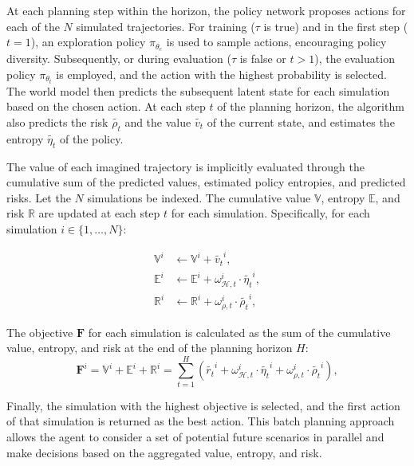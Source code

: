 At each planning step within the horizon, the policy network proposes actions for each of the $N$ simulated trajectories. For training ($\tau$ is true) and in the first step ($t=1$), an exploration policy $\pi_{\theta_e}$ is used to sample actions, encouraging policy diversity. Subsequently, or during evaluation ($\tau$ is false or $t>1$), the evaluation policy $\pi_{\theta_t}$ is employed, and the action with the highest probability is selected. The world model then predicts the subsequent latent state for each simulation based on the chosen action. At each step $t$ of the planning horizon, the algorithm also predicts the risk $\widetilde{\rho_t}$ and the value $\widetilde{v_t}$ of the current state, and estimates the entropy $\widetilde{\eta_t}$ of the policy.

The value of each imagined trajectory is implicitly evaluated through the cumulative sum of the predicted values, estimated policy entropies, and predicted risks. Let the $N$ simulations be indexed. The cumulative value $\mathbb{V}$, entropy $\mathbb{E}$, and risk $\mathbb{R}$ are updated at each step $t$ for each simulation. Specifically, for each simulation $i \in \{1, \dots, N\}$:

\begin{equation}
    \begin{split}
        \mathbb{V}^i &\gets \mathbb{V}^i + \widetilde{v_t}^i, \\
        \mathbb{E}^i &\gets \mathbb{E}^i + \omega_{\mathcal{H}, t}^i \cdot \widetilde{\eta_t}^i, \\
        \mathbb{R}^i &\gets \mathbb{R}^i + \omega_{\rho, t}^i \cdot \widetilde{\rho_t}^i,
    \end{split}
\end{equation}


The objective $\mathbf{F}$ for each simulation is calculated as the sum of the cumulative value, entropy, and risk at the end of the planning horizon $H$:
\begin{equation}
    \mathbf{F}^i = \mathbb{V}^i + \mathbb{E}^i + \mathbb{R}^i = \sum_{t=1}^{H} \left( \widetilde{r_t}^i + \omega_{\mathcal{H}, t}^i \cdot \widetilde{\eta_t}^i + \omega_{\rho, t}^i \cdot \widetilde{\rho_t}^i \right),
\end{equation}

Finally, the simulation with the highest objective is selected, and the first action of that simulation is returned as the best action. This batch planning approach allows the agent to consider a set of potential future scenarios in parallel and make decisions based on the aggregated value, entropy, and risk.

